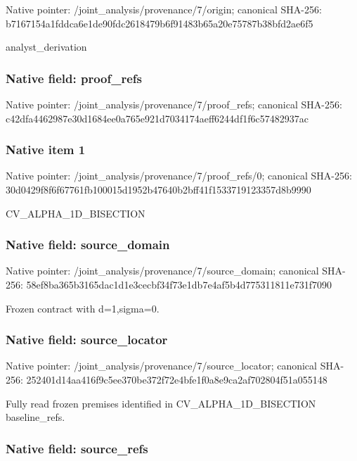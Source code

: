 \documentclass[10pt,a4paper]{article}
\begin{document}
Native pointer: /joint\_analysis/provenance/7/origin; canonical SHA-256: b7167154a1fddca6e1de90fd\allowbreak{}c2618479b6f91483b65a20e7\allowbreak{}5787b38bfd2ae6f5


analyst\_derivation


\subsubsection{Native field: proof\_refs}


Native pointer: /joint\_analysis/provenance/7/proof\_refs; canonical SHA-256: c42dfa4462987e30d1684ee0\allowbreak{}a765e921d7034174aeff6244\allowbreak{}df1f6c57482937ac



\subsubsection{Native item 1}


Native pointer: /joint\_analysis/provenan\allowbreak{}ce/7/proof\_refs/0; canonical SHA-256: 30d0429f8f6f67761fb10001\allowbreak{}5d1952b47640b2bff41f1533\allowbreak{}719123357d8b9990


CV\_ALPHA\_1D\_BISECTION


\subsubsection{Native field: source\_domain}


Native pointer: /joint\_analysis/provenan\allowbreak{}ce/7/source\_domain; canonical SHA-256: 58ef8ba365b3165dac1d1e3c\allowbreak{}ecbf34f73e1db7e4af5b4d77\allowbreak{}5311811e731f7090


Frozen contract with d=1,sigma=0.


\subsubsection{Native field: source\_locator}


Native pointer: /joint\_analysis/provenan\allowbreak{}ce/7/source\_locator; canonical SHA-256: 252401d14aa416f9c5ee370b\allowbreak{}e372f72e4bfe1f0a8e9ca2af\allowbreak{}702804f51a055148


Fully read frozen premises identified in CV\_ALPHA\_1D\_BISECTION baseline\_refs.


\subsubsection{Native field: source\_refs}
\end{document}
